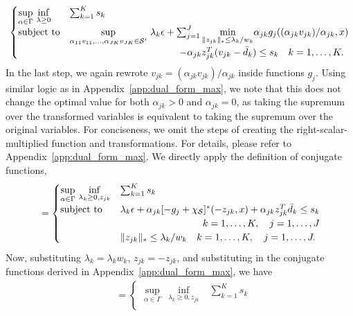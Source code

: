 \documentclass[12pt]{article}
\theoremstyle{thmstyleone}%
\theoremstyle{thmstyletwo}%
\theoremstyle{thmstylethree}%
\begin{document}
\begin{appendices}
{\begin{equation*}
\begin{aligned}
\begin{cases}
					\underset{\alpha \in \Gamma}{\sup}~\underset{\lambda \geq 0}{\inf} &\sum_{k=1}^K s_k  \\
					\mbox{subject to}&\underset{\alpha_{11}v_{11}, \dots, \alpha_{JK}v_{JK} \in \supp'}{\sup}~ \lambda_k \epsilon+ \sum_{j=1}^J \underset{\|z_{jk}\|_* \leq \lambda_k/w_k}{\min} \alpha_{jk}g_j((\alpha_{jk}v_{jk})/\alpha_{jk}, x) \\
					& \hspace{4cm} - \alpha_{jk}z_{jk}^T(v_{jk} - \bar{d}_k)\le s_k \quad k = 1,\dots,K.
				\end{cases}\\
\end{aligned}
\end{equation*}
In the last step, we again rewrote $v_{jk} = (\alpha_{jk}v_{jk})/\alpha_{jk}$ inside functions $g_j$. Using similar logic as in Appendix~\ref{app:dual_form_max}, we note that this does not change the optimal value for both $\alpha_{jk} > 0$ and  $\alpha_{jk} = 0$, as taking the supremum over the transformed variables is equivalent to taking the supremum over the original variables. For conciseness, we omit the steps of creating the right-scalar-multiplied function and transformations. For details, please refer to Appendix~\ref{app:dual_form_max}.
We directly apply the definition of conjugate functions,
\begin{equation*}
	\begin{aligned}
&= \begin{cases}
	\underset{\alpha \in \Gamma}{\sup}~\underset{\lambda_k \geq 0, z_{jk}}{\inf} &  \sum_{k=1} ^K s_k \\
	\mbox{subject to}&\lambda_k \epsilon+ \alpha_{jk}[-g_j +\chi_{\supp}]^*(-z_{jk},x) +\alpha_{jk}z_{jk}^T\bar{d}_k \le s_k \\
	&\hfill \quad k = 1,\dots,K, \quad j = 1,\dots,J\\
	& \|z_{jk}\|_* \leq \lambda_k/w_k \quad k = 1,\dots,K, \quad j = 1,\dots,J.
\end{cases}\\
\end{aligned}
\end{equation*}
Now, substituting $\lambda_k = \lambda_k w_k$, $z_{jk} = -z_{jk}$, and substituting in the conjugate functions derived in Appendix~\ref{app:dual_form_max}, we have 
\begin{equation*}
\begin{aligned}
&= \begin{cases}
	\underset{\alpha \in \Gamma}{\sup}~\underset{\lambda_k \geq 0, z_{jk}}{\inf} &  \sum_{k=1} ^K s_k \\

\end{cases}
\end{aligned}
\end{equation*}}
\end{appendices}
\end{document}
